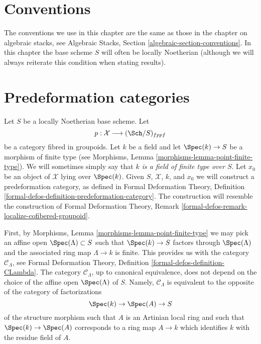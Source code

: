 \section{Conventions}
\label{section-conventions}

\noindent
The conventions we use in this chapter are the same as those in the
chapter on algebraic stacks, see
Algebraic Stacks, Section \ref{algebraic-section-conventions}.
In this chapter the base scheme $S$ will often be locally Noetherian
(although we will always reiterate this condition when stating
results).





\section{Predeformation categories}
\label{section-predeformation-categories}

\noindent
Let $S$ be a locally Noetherian base scheme. Let
$$
p : \mathcal{X} \longrightarrow (\Sch/S)_{fppf}
$$
be a category fibred in groupoids. Let $k$ be a field
and let $\Spec(k) \to S$ be a morphism of finite type (see
Morphisms, Lemma \ref{morphisms-lemma-point-finite-type}). We will sometimes
simply say that {\it $k$ is a field of finite type over $S$}. Let
$x_0$ be an object of $\mathcal{X}$ lying over $\Spec(k)$.
Given $S$, $\mathcal{X}$, $k$, and $x_0$ we will construct a
predeformation category, as defined in
Formal Deformation Theory,
Definition \ref{formal-defos-definition-predeformation-category}.
The construction will resemble the construction of
Formal Deformation Theory,
Remark \ref{formal-defos-remark-localize-cofibered-groupoid}.

\medskip\noindent
First, by Morphisms, Lemma \ref{morphisms-lemma-point-finite-type}
we may pick an affine open $\Spec(\Lambda) \subset S$ such that
$\Spec(k) \to S$ factors through $\Spec(\Lambda)$ and the associated
ring map $\Lambda \to k$ is finite. This provides us with the category
$\mathcal{C}_\Lambda$, see
Formal Deformation Theory, Definition \ref{formal-defos-definition-CLambda}.
The category $\mathcal{C}_\Lambda$, up to canonical equivalence,
does not depend on the choice of the affine open $\Spec(\Lambda)$ of $S$.
Namely, $\mathcal{C}_\Lambda$ is equivalent to the opposite
of the category of factorizations
\begin{equation}
\label{equation-factor}
\Spec(k) \to \Spec(A) \to S
\end{equation}
of the structure morphism such that $A$ is an Artinian local ring and
such that $\Spec(k) \to \Spec(A)$ corresponds to a ring map $A \to k$ which
identifies $k$ with the residue field of $A$.

